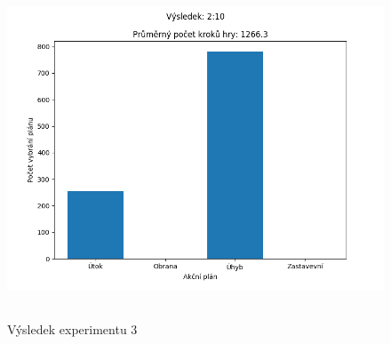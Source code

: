 \begin{figure}[p]\centering
\includegraphics[width=125mm, height=100mm]{./Obrazky/Experiment03Results.png}
\caption{Výsledek experimentu 3}
\label{Výsledek experimentu 03}
\end{figure}







